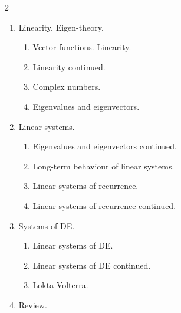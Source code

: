\documentclass[../main.tex]{subfiles}
\begin{document}
\begin{multicols}{2}
\begin{enumerate}[wide, label={\textbf{Week \arabic*}.}]
  \item Linearity. Eigen-theory.
    \begin{enumerate}[resume]
      \item Vector functions. Linearity.
      \item Linearity continued.
      \item Complex numbers.
      \item Eigenvalues and eigenvectors.
    \end{enumerate}

  \item Linear systems.
    \begin{enumerate}[resume]
      \item Eigenvalues and eigenvectors continued.
      \item Long-term behaviour of linear systems.
      \item Linear systems of recurrence.
      \item Linear systems of recurrence continued.
    \end{enumerate}

  \item Systems of DE.
    \begin{enumerate}[resume]
      \item Linear systems of DE.
      \item Linear systems of DE continued.
      \item Lokta-Volterra.
    \end{enumerate}

  \item Review.
  \end{enumerate}
\end{multicols}
\clearpage
\end{document}
